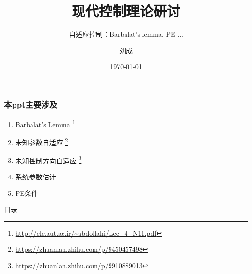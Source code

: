 \documentclass{beamer}
\title{现代控制理论研讨}
\subtitle{自适应控制：Barbalat's lemma, PE ...}
\author{刘成}
\institute{中山大学 航空航天学院}
\date{\today}
\begin{document}
\begin{frame}
  \titlepage
\end{frame}

\begin{frame}
  \frametitle{本ppt主要涉及}
  \begin{enumerate}
    \item Barbalat's Lemma \footnote{\url{http://ele.aut.ac.ir/~abdollahi/Lec_4_N11.pdf}}
    \item 未知参数自适应 \footnote{\url{https://zhuanlan.zhihu.com/p/9450457498}}
    \item 未知控制方向自适应 \footnote{\url{https://zhuanlan.zhihu.com/p/9910889013}}
    \item 系统参数估计
    \item PE条件 
  \end{enumerate}
\end{frame}

\begin{frame}{目录}
  \tableofcontents[sectionstyle=show/shaded, subsectionstyle=show/show/shaded]
\end{frame}




\end{document}

